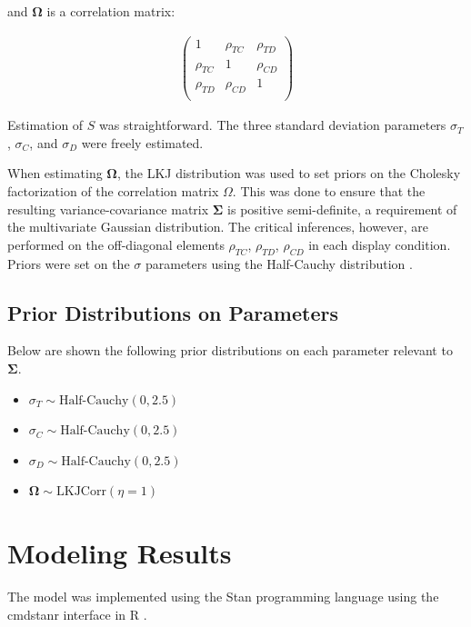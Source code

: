 and $\boldsymbol{\Omega}$ is a correlation matrix:

\begin{align}
   \begin{pmatrix}
      1 & \rho_{TC} & \rho_{TD} \\
      \rho_{TC} & 1 & \rho_{CD} \\
      \rho_{TD} & \rho_{CD} & 1 \\
   \end{pmatrix}
   \label{eqn:O_1}
\end{align}

Estimation of $S$ was straightforward. The three standard deviation parameters $\sigma_{T}$, $\sigma_{C}$, and $\sigma_{D}$ were freely estimated.

When estimating $\boldsymbol{\Omega}$, the LKJ distribution \parencite{lewandowski2009generating} was used to set priors on the Cholesky factorization of the correlation matrix $\Omega$. This was done to ensure that the resulting variance-covariance matrix $\boldsymbol{\Sigma}$ is positive semi-definite, a requirement of the multivariate Gaussian distribution. The critical inferences, however, are performed on the off-diagonal elements $\rho_{TC}$, $\rho_{TD}$, $\rho_{CD}$ in each display condition. Priors were set on the $\sigma$ parameters using the Half-Cauchy distribution \parencite{gelman2006prior}. 

\subsection{Prior Distributions on Parameters}
Below are shown the following prior distributions on each parameter relevant to $\boldsymbol{\Sigma}$.
\begin{itemize}
    \item $\sigma_{T} \sim\text{Half-Cauchy}(0,2.5)$
    \item $\sigma_{C} \sim\text{Half-Cauchy}(0,2.5)$
    \item $\sigma_{D} \sim\text{Half-Cauchy}(0,2.5)$
    \item $\boldsymbol{\Omega} \sim \text{LKJCorr}(\eta=1)$
\end{itemize}

\section{Modeling Results}
The model was implemented using the Stan programming language \parencite{carpenter2017stan} using the cmdstanr interface \parencite{cmdstanr} in R . 

